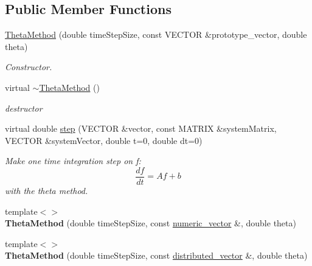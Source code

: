 \subsection*{Public Member Functions}
\begin{DoxyCompactItemize}
\item 
\hyperlink{classnatrium_1_1ThetaMethod_a7b5ec1aa8b646768c45cc422651ec905}{ThetaMethod} (double timeStepSize, const VECTOR \&prototype\_\-vector, double theta)
\begin{DoxyCompactList}\small\item\em Constructor. \item\end{DoxyCompactList}\item 
\hypertarget{classnatrium_1_1ThetaMethod_ac742c678ab9674722295585f10d27279}{
virtual \hyperlink{classnatrium_1_1ThetaMethod_ac742c678ab9674722295585f10d27279}{$\sim$ThetaMethod} ()}
\label{classnatrium_1_1ThetaMethod_ac742c678ab9674722295585f10d27279}

\begin{DoxyCompactList}\small\item\em destructor \item\end{DoxyCompactList}\item 
virtual double \hyperlink{classnatrium_1_1ThetaMethod_a25fb9b235e61a96de76139919d7fbbfe}{step} (VECTOR \&vector, const MATRIX \&systemMatrix, VECTOR \&systemVector, double t=0, double dt=0)
\begin{DoxyCompactList}\small\item\em Make one time integration step on f: \[ \frac{df}{dt} = Af+b \] with the theta method. \item\end{DoxyCompactList}\item 
\hypertarget{classnatrium_1_1ThetaMethod_abbab4d93f6d54e1b82ea8cc008eba126}{
{\footnotesize template$<$$>$ }\\{\bfseries ThetaMethod} (double timeStepSize, const \hyperlink{namespacenatrium_a67c39077adc6634f8fa3762b8eef24c4}{numeric\_\-vector} \&, double theta)}
\label{classnatrium_1_1ThetaMethod_abbab4d93f6d54e1b82ea8cc008eba126}

\item 
\hypertarget{classnatrium_1_1ThetaMethod_a8ab913e8242378d6877ef6dcee80aebb}{
{\footnotesize template$<$$>$ }\\{\bfseries ThetaMethod} (double timeStepSize, const \hyperlink{namespacenatrium_a903d2b92917f582f2ff05f52160ab811}{distributed\_\-vector} \&, double theta)}
\label{classnatrium_1_1ThetaMethod_a8ab913e8242378d6877ef6dcee80aebb}


\end{DoxyCompactItemize}
